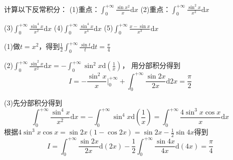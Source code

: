 ~

\begin{exercise}[Dirichlet积分的应用]
  计算以下反常积分：
  (1)重点：$\int_0^{+\infty} \frac{\sin x^2}{x}\mathrm{d} x$
  (2)重点：$\int_0^{+\infty} \frac{\sin^2 x}{x^2}\mathrm{d} x$

  (3)$\int_0^{+\infty} \frac{\sin^4 x}{x^2}\mathrm{d} x$
  (4)$\int_0^{+\infty} \frac{\sin^4 x}{x^4}\mathrm{d} x$
  (5)$\int_0^{+\infty} \frac{x - \sin x}{x^3}\mathrm{d} x$
\end{exercise}

\begin{solution}
  (1)做$t = x^2$，得到$\frac{1}{2}\int_0^{+\infty} \frac{\sin t}{t}\mathrm{d} t = \frac{\pi}{4}$

  (2)$\int_0^{+\infty} \frac{\sin^2 x}{x^2}\mathrm{d} x = - \int_0^{+\infty} \sin^2 x \mathrm{d} \left( \frac{1}{x} \right)$，
  用分部积分得到
  \begin{equation*}
    I = - \frac{\sin^2 x}{x} \bigg|_0^{+\infty} + \int_0^{+\infty} \frac{\sin 2x}{2x}\mathrm{d} 2x = \frac{\pi}{2}
  \end{equation*}

  (3)先分部积分得到
  \begin{equation*}
    \int_0^{+\infty} \frac{\sin^4 x}{x^2}\mathrm{d} x = - \int_0^{+\infty} \sin^4 x \mathrm{d} \left( \frac{1}{x} \right) = \int_0^{+\infty} \frac{4 \sin^3 x \cos x}{x}\mathrm{d} x
  \end{equation*}
  根据$4\sin^3x \cos x = \sin 2x(1 - \cos 2x) = \sin 2x - \frac{1}{2} \sin 4x$得到
  \begin{equation*}
    I = \int_0^{+\infty} \frac{\sin 2x}{2x}\mathrm{d}(2x) - \frac{1}{2} \int_0^{+\infty} \frac{\sin 4x}{4x}\mathrm{d} (4x) = \frac{\pi}{4}
  \end{equation*}
\end{solution}